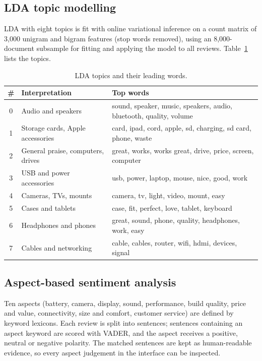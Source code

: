 \documentclass[12pt,a4paper]{report}
\begin{document}
\subsection{LDA topic modelling}
LDA with eight topics is fit with online variational inference on a count matrix of 3,000 unigram and bigram features (stop words removed), using an 8,000-document subsample for fitting and applying the model to all reviews. Table~\ref{tab:lda} lists the topics.
\begin{table}[htbp]
\centering
\caption{LDA topics and their leading words.}\label{tab:lda}
\small
\begin{tabularx}{\textwidth}{@{}c>{\raggedright\arraybackslash}p{3.7cm}X@{}}
\toprule
\# & Interpretation & Top words \\
\midrule
0 & Audio and speakers & sound, speaker, music, speakers, audio, bluetooth, quality, volume \\
1 & Storage cards, Apple accessories & card, ipad, cord, apple, sd, charging, sd card, phone, waste \\
2 & General praise, computers, drives & great, works, works great, drive, price, screen, computer \\
3 & USB and power accessories & usb, power, laptop, mouse, nice, good, work \\
4 & Cameras, TVs, mounts & camera, tv, light, video, mount, easy \\
5 & Cases and tablets & case, fit, perfect, love, tablet, keyboard \\
6 & Headphones and phones & great, sound, phone, quality, headphones, work, easy \\
7 & Cables and networking & cable, cables, router, wifi, hdmi, devices, signal \\
\bottomrule
\end{tabularx}
\end{table}
\subsection{Aspect-based sentiment analysis}
Ten aspects (battery, camera, display, sound, performance, build quality, price and value, connectivity, size and comfort, customer service) are defined by keyword lexicons. Each review is split into sentences; sentences containing an aspect keyword are scored with VADER, and the aspect receives a positive, neutral or negative polarity. The matched sentences are kept as human-readable evidence, so every aspect judgement in the interface can be inspected.
\end{document}
